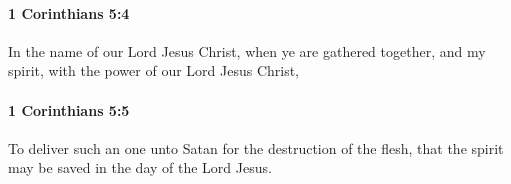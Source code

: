 		\paragraph{1 Corinthians 5:4} %
			\label{1CORINTHIANS-5-4}

			In the name of our Lord Jesus Christ, when ye are gathered together, and my spirit, with the power of our Lord Jesus Christ,

			\begin{framed}
			\scriptsize
				\begin{compactdesc}
					\item[SBLG] 
				\end{compactdesc}
			\end{framed}

		\paragraph{1 Corinthians 5:5} %
			\label{1CORINTHIANS-5-5}

			To deliver such an one unto Satan for the destruction of the flesh, that the spirit may be saved in the day of the Lord Jesus.

